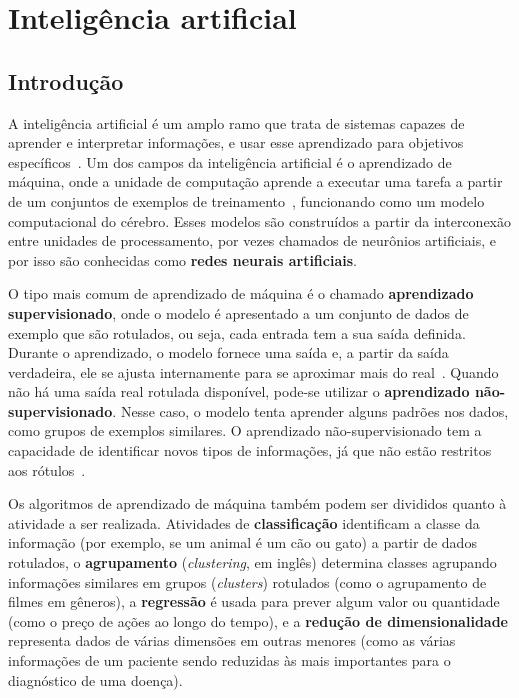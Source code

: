\chapter{Inteligência artificial}\label{cap:ia} %
\section{Introdução}\label{sec:ia_intro}
A inteligência artificial é um amplo ramo que trata de sistemas capazes de aprender e interpretar informações, e usar esse aprendizado para objetivos específicos~\cite{haenlein_brief_2019}. Um dos campos da inteligência artificial é o aprendizado de máquina, onde a unidade de computação aprende a executar uma tarefa a partir de um conjuntos de exemplos de treinamento~\cite{louridas_machine_2016}, funcionando como um modelo computacional do cérebro. Esses modelos são construídos a partir da interconexão entre unidades de processamento, por vezes chamados de neurônios artificiais, e por isso são conhecidas como \textbf{redes neurais artificiais}.

O tipo mais comum de aprendizado de máquina é o chamado \textbf{aprendizado supervisionado}, onde o modelo é apresentado a um conjunto de dados de exemplo que são rotulados, ou seja, cada entrada tem a sua saída definida. Durante o aprendizado, o modelo fornece uma saída e, a partir da saída verdadeira, ele se ajusta internamente para se aproximar mais do real~\cite{lecun_deep_2015}. Quando não há uma saída real rotulada disponível, pode-se utilizar o \textbf{aprendizado não-supervisionado}. Nesse caso, o modelo tenta aprender alguns padrões nos dados, como grupos de exemplos similares. O aprendizado não-supervisionado tem a capacidade de identificar novos tipos de informações, já que não estão restritos aos rótulos~\cite{asnicar_machine_2023}.

Os algoritmos de aprendizado de máquina também podem ser divididos quanto à atividade a ser realizada. Atividades de \textbf{classificação} identificam a classe da informação (por exemplo, se um animal é um cão ou gato) a partir de dados rotulados, o \textbf{agrupamento} (\textit{clustering}, em inglês) determina classes agrupando informações similares em grupos (\textit{clusters}) rotulados (como o agrupamento de filmes em gêneros), a \textbf{regressão} é usada para prever algum valor ou quantidade (como o preço de ações ao longo do tempo), e a \textbf{redução de dimensionalidade} representa dados de várias dimensões em outras menores (como as várias informações de um paciente sendo reduzidas às mais importantes para o diagnóstico de uma doença).

